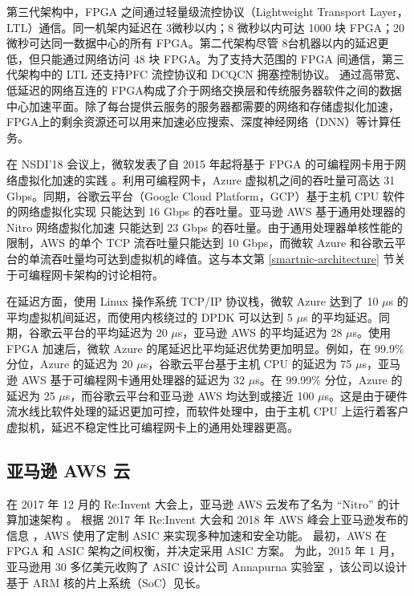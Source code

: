第三代架构中，FPGA 之间通过轻量级流控协议（Lightweight Transport Layer，LTL）通信。同一机架内延迟在 3微秒以内；8 微秒以内可达 1000 块 FPGA；20 微秒可达同一数据中心的所有 FPGA。第二代架构尽管 8台机器以内的延迟更低，但只能通过网络访问 48 块 FPGA。为了支持大范围的 FPGA 间通信，第三代架构中的 LTL 还支持PFC 流控协议和 DCQCN 拥塞控制协议。
通过高带宽、低延迟的网络互连的 FPGA构成了介于网络交换层和传统服务器软件之间的数据中心加速平面。除了每台提供云服务的服务器都需要的网络和存储虚拟化加速，FPGA上的剩余资源还可以用来加速必应搜索、深度神经网络（DNN）等计算任务。

在 NSDI'18 会议上，微软发表了自 2015 年起将基于 FPGA 的可编程网卡用于网络虚拟化加速的实践 \cite{smartnic}。利用可编程网卡，Azure 虚拟机之间的吞吐量可高达 31 Gbps。同期，谷歌云平台（Google Cloud Platform，GCP）基于主机 CPU 软件的网络虚拟化实现 \cite{andromeda} 只能达到 16 Gbps 的吞吐量。亚马逊 AWS 基于通用处理器的 Nitro 网络虚拟化加速 \cite{nitro-talk} 只能达到 23 Gbps 的吞吐量。由于通用处理器单核性能的限制，AWS 的单个 TCP 流吞吐量只能达到 10 Gbps，而微软 Azure 和谷歌云平台的单流吞吐量均可达到虚拟机的峰值。这与本文第 \ref{smartnic-architecture} 节关于可编程网卡架构的讨论相符。

在延迟方面，使用 Linux 操作系统 TCP/IP 协议栈，微软 Azure 达到了 10 $\mu$s 的平均虚拟机间延迟，而使用内核绕过的 DPDK \cite{dpdk} 可以达到 5 $\mu$s 的平均延迟。同期，谷歌云平台的平均延迟为 20 $\mu$s，亚马逊 AWS 的平均延迟为 28 $\mu$s。使用 FPGA 加速后，微软 Azure 的尾延迟比平均延迟优势更加明显。例如，在 99.9\% 分位，Azure 的延迟为 20 $\mu$s，谷歌云平台基于主机 CPU 的延迟为 75 $\mu$s，亚马逊 AWS 基于可编程网卡通用处理器的延迟为 32 $\mu$s。在 99.99\% 分位，Azure 的延迟为 25 $\mu$s，而谷歌云平台和亚马逊 AWS 均达到或接近 100 $\mu$s。这是由于硬件流水线比软件处理的延迟更加可控，而软件处理中，由于主机 CPU 上运行着客户虚拟机，延迟不稳定性比可编程网卡上的通用处理器更高。



\subsection{亚马逊 AWS 云}

在 2017 年 12 月的 Re:Invent 大会上，亚马逊 AWS 云发布了名为 ``Nitro'' 的计算加速架构 \cite{nitro-blog}。
根据 2017 年 Re:Invent 大会和 2018 年 AWS 峰会上亚马逊发布的信息 \cite{nitro-talk,nitro-web}，AWS 使用了定制 ASIC 来实现多种加速和安全功能。
最初，AWS 在 FPGA 和 ASIC 架构之间权衡，并决定采用 ASIC 方案。
为此，2015 年 1 月，亚马逊用 30 多亿美元收购了 ASIC 设计公司 Annapurna 实验室 \cite{annapurna}，该公司以设计基于 ARM 核的片上系统（SoC）见长。

